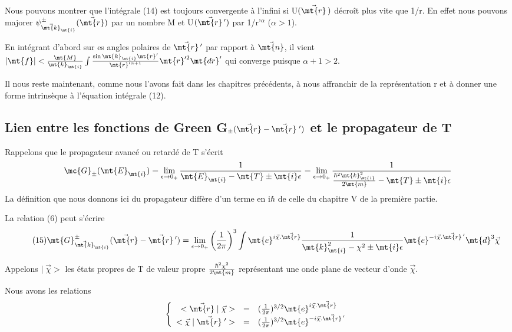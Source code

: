 {\footnotesize
Nous pouvons montrer que l'intégrale (14) est toujours convergente à
l'infini si U$(\vec{\mt{r}}\,)$ décroît plus vite que 1/r. En effet nous pouvons majorer
$\psi_{\vec{\mt{k}}_\mt{i}}^\pm(\vec{\mt{r}})$ par un nombre M et U$(\vec{\mt{r}}\,')$ par 1/r'$^\alpha$ ($\alpha>1$).

En intégrant d'abord sur es angles polaires de $\vec{\mt{r}}\,'$ par rapport
à $\vec{\mt{n}}$, il vient
$
|\mt{f}|<\frac{\mt{M}}{\mt{k}_\mt{i}}\int\frac{\sin \mt{k}_\mt{i} \mt{r}'}{\mt{r}'^{\alpha+1}}\mt{ r}'^2\mt{ dr}'
$
qui converge puisque \ul{$\alpha+1>2$}.
}

Il nous reste maintenant, comme nous l'avons fait dans les
chapitres précédents, à nous affranchir de la représentation r et à donner une forme
intrinsèque à l'équation intégrale (12).

\subsection{Lien entre les fonctions de Green G$_\pm(\vec{\mt{r}}-\vec{\mt{r}}\;')$ et le
propagateur de T}%

Rappelons que le propagateur avancé ou retardé de T s'écrit
\[
\mc{G}_\pm(\mt{E}_\mt{i})=\lim_{\epsilon\to 0_+}\frac{1}{\mt{E}_\mt{i}-\mt{T}\pm\mt{i}\epsilon}=\lim_{\epsilon\to 0_+}\frac{1}{\frac{\hbar^2\mt{k}_\mt{i}^2}{2\mt{m}}-\mt{T}\pm\mt{i}\epsilon}
\]
{\footnotesize
La définition que nous donnons ici du propagateur diffère d'un terme
en i$\hbar$ de celle du chapitre V de la première partie.
}

La relation (6) peut s'écrire
\[
\tag{15}\mt{G}^\pm_{\vec{\mt{k}}_\mt{i}}(\vec{\mt{r}}-\vec{\mt{r}}\,')=\lim_{\epsilon\to 0_+}\left(\frac{1}{2\pi}\right)^3
\int
\mt{e}^{i\vec{\chi}.\vec{\mt{r}}}
\frac{1}{\mt{k}_\mt{i}^2-\chi^2\pm \mt{i}\epsilon}
\mt{e}^{-i\vec{\chi}.\vec{\mt{r}}\,'}
\mt{d}^3\vec{\chi}
\]

Appelons $|\;\vec{\chi}>$ les états propres de T de valeur propre $\frac{\hbar^2\chi^2}{2\mt{m}}$
 représentant une onde plane de vecteur d'onde $\vec{\chi}$.

Nous avons les relations
\[
\left\{
\begin{array}{rcl}
 <\vec{\mt{r}}\;|\;\vec{\chi}> & = & (\frac{1}{2\pi})^{3/2}\mt{e}^{i\vec{\chi}.\vec{\mt{r}}} \\
 <\vec{\chi}\;|\;\vec{\mt{r}}\;'> & = & (\frac{1}{2\pi})^{3/2}\mt{e}^{-i\vec{\chi}.\vec{\mt{r}}\,'}
\end{array} \right.
\]

